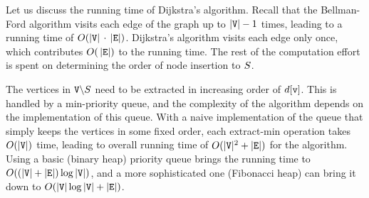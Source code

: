 Let us discuss the running time of Dijkstra's algorithm. Recall that the Bellman-Ford algorithm visits each edge of the graph up to $|{\tt V}|-1$ times, leading to a running time of $O(|{\tt V}|\, \cdot \,|{\tt E}|)$. Dijkstra's algorithm visits each edge only once, which contributes $O(\,|{\tt E}|)$ to the running time. The rest of the computation effort is spent on determining the order of node insertion to ${S}$.

The vertices in ${\tt V}\backslash {S}$ need to be extracted in increasing order of $d[{\tt v}]$.  This is handled by a min-priority queue, and the complexity of the algorithm depends on the implementation of this queue.
With a naive implementation of the queue that simply keeps the vertices in some fixed order, each extract-min operation takes  $O(|{\tt V}|)$ time, leading to overall running time of $O(|{\tt V}{|^2} + |{\tt E}|)$ for the algorithm. Using a basic (binary heap) priority queue brings the running time to $O((|{\tt V}| + |{\tt E}|)\log |{\tt V}|)$, and a more sophisticated one (Fibonacci heap) can bring it down to  $O(|{\tt V}|\log |{\tt V}| + |{\tt E}|)$.


